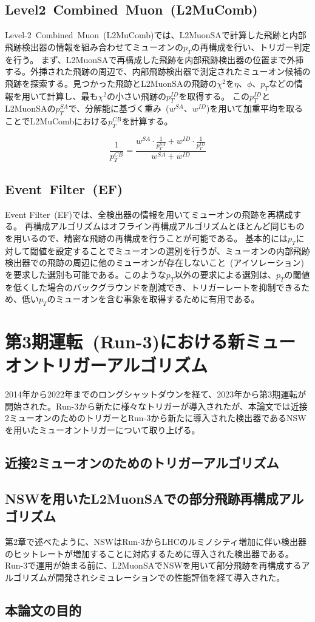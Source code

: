 \subsection{Level2~Combined~Muon~(L2MuComb)}\label{chapter3-2-3}
Level-2~Combined~Muon~(L2MuComb)では、L2MuonSAで計算した飛跡と内部飛跡検出器の情報を組み合わせてミューオンの$p_T$の再構成を行い、トリガー判定を行う。
まず、L2MuonSAで再構成した飛跡を内部飛跡検出器の位置まで外挿する。外挿された飛跡の周辺で、内部飛跡検出器で測定されたミューオン候補の飛跡を探索する。見つかった飛跡とL2MuonSAの飛跡の$\chi^2$を$\eta$、$\phi$、$p_T$などの情報を用いて計算し、最も$\chi^2$の小さい飛跡の$p_T^{ID}$を取得する。
この$p_T^{ID}$とL2MuonSAの$p_T^{SA}$で、分解能に基づく重み~($w^{SA}$、$w^{ID}$)を用いて加重平均を取ることでL2MuCombにおける$p_T^{CB}$を計算する。

\begin{equation}
    \frac{1}{p_T^{C B}}=\frac{w^{S A} \cdot \frac{1}{p_T^{S A}}+w^{I D} \cdot \frac{1}{p_T^{I D}}}{w^{S A}+w^{I D}}
\end{equation}

\subsection{Event~Filter~(EF)}\label{chapter3-2-4}
Event Filter~(EF)では、全検出器の情報を用いてミューオンの飛跡を再構成する。
再構成アルゴリズムはオフライン再構成アルゴリズムとほとんど同じものを用いるので、精密な飛跡の再構成を行うことが可能である。
基本的には$p_T$に対して閾値を設定することでミューオンの選別を行うが、ミューオンの内部飛跡検出器での飛跡の周辺に他のミューオンが存在しないこと~(アイソレーション)を要求した選別も可能である。このような$p_T$以外の要求による選別は、$p_T$の閾値を低くした場合のバックグラウンドを削減でき、トリガーレートを抑制できるため、低い$p_T$のミューオンを含む事象を取得するために有用である。

\section{第3期運転~(Run-3)における新ミューオントリガーアルゴリズム}\label{chapter3-3}
2014年から2022年までのロングシャットダウンを経て、2023年から第3期運転が開始された。Run-3から新たに様々なトリガーが導入されたが、本論文では近接2ミューオンのためのトリガーとRun-3から新たに導入された検出器であるNSWを用いたミューオントリガーについて取り上げる。

\subsection{近接2ミューオンのためのトリガーアルゴリズム}\label{chapter3-3-1}

\subsection{NSWを用いたL2MuonSAでの部分飛跡再構成アルゴリズム}\label{chapter3-3-2}
第2章で述べたように、NSWはRun-3からLHCのルミノシティ増加に伴い検出器のヒットレートが増加することに対応するために導入された検出器である。
Run-3で運用が始まる前に、L2MuonSAでNSWを用いて部分飛跡を再構成するアルゴリズムが開発されシミュレーションでの性能評価を経て導入された。


\subsection{本論文の目的}\label{chapter3-4}